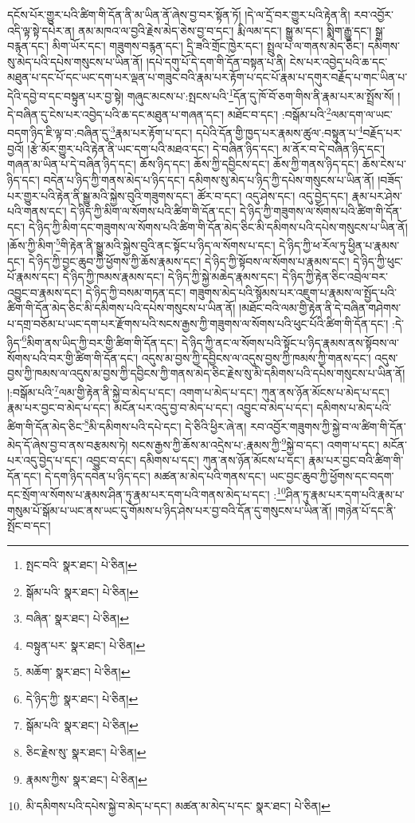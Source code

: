དངོས་པོར་གྱུར་པའི་ཚིག་གི་དོན་ནི་མ་ཡིན་ནོ་ཞེས་བྱ་བར་སྟོན་ཏོ། །དེ་ལ་དྲོ་བར་གྱུར་པའི་རྟེན་ནི། རབ་འབྱོར་འདི་ལྟ་སྟེ་དཔེར་ན། ནམ་མཁའ་ལ་བྱའི་རྗེས་མེད་ཅེས་བྱ་བ་དང་། རྨི་ལམ་དང་། སྒྱུ་མ་དང་། སྨིག་རྒྱུ་དང་། སྒྲ་བརྙན་དང་། མིག་ཡོར་དང་། གཟུགས་བརྙན་དང་། དྲི་ཟའི་གྲོང་ཁྱེར་དང་། སྤྲུལ་པ་ལ་གནས་མེད་ཅིང་། དམིགས་སུ་མེད་པའི་དཔེས་གསུངས་པ་ཡིན་ནོ། །དཔེ་དགུ་པོ་དེ་དག་གི་དོན་བསྟན་པ་ནི། ངེས་པར་འབྱེད་པའི་ཆ་དང་མཐུན་པ་དང་པོ་དང་ཡང་དག་པར་ལྡན་པ་གཟུང་བའི་རྣམ་པར་རྟོག་པ་དང་པོ་རྣམ་པ་དགུར་བརྗོད་པ་གང་ཡིན་པ་དེའི་དབྱེ་བ་དང་བསྟུན་པར་བྱ་སྟེ། གཞུང་མངས་པ་:སྤངས་པའི་\footnote{སྤང་བའི་  སྣར་ཐང་།  པེ་ཅིན། }དོན་དུ་ཁོ་བོ་ཅག་གིས་ནི་རྣམ་པར་མ་སྤྲོས་སོ། །དེ་བཞིན་དུ་ངེས་པར་འབྱེད་པའི་ཆ་དང་མཐུན་པ་གཞན་དང་། མཐོང་བ་དང་། :བསྒོམ་པའི་\footnote{སྒོམ་པའི་  སྣར་ཐང་།  པེ་ཅིན། }ལམ་དག་ལ་ཡང་བདག་ཉིད་ཇི་ལྟ་བ་:བཞིན་དུ་\footnote{བཞིན་  སྣར་ཐང་།  པེ་ཅིན། }རྣམ་པར་རྟོག་པ་དང་། དཔེའི་དོན་གྱི་ཁྱད་པར་རྣམས་ཚུལ་:བསྟུན་པ་\footnote{བསྟུན་པར་  སྣར་ཐང་།  པེ་ཅིན། }བརྗོད་པར་བྱའོ། །རྩེ་མོར་གྱུར་པའི་རྟེན་ནི་ཡང་དག་པའི་མཐའ་དང་། དེ་བཞིན་ཉིད་དང་། མ་ནོར་བ་དེ་བཞིན་ཉིད་དང་། གཞན་མ་ཡིན་པ་དེ་བཞིན་ཉིད་དང་། ཆོས་ཉིད་དང་། ཆོས་ཀྱི་དབྱིངས་དང་། ཆོས་ཀྱི་གནས་ཉིད་དང་། ཆོས་ངེས་པ་ཉིད་དང་། བདེན་པ་ཉིད་ཀྱི་གནས་མེད་པ་ཉིད་དང་། དམིགས་སུ་མེད་པ་ཉིད་ཀྱི་དཔེས་གསུངས་པ་ཡིན་ནོ། །བཟོད་པར་གྱུར་པའི་རྟེན་ནི་སྒྱུ་མའི་སྐྱེས་བུའི་གཟུགས་དང་། ཚོར་བ་དང་། འདུ་ཤེས་དང་། འདུ་བྱེད་དང་། རྣམ་པར་ཤེས་པའི་གནས་དང་། དེ་ཉིད་ཀྱི་མིག་ལ་སོགས་པའི་ཚིག་གི་དོན་དང་། དེ་ཉིད་ཀྱི་གཟུགས་ལ་སོགས་པའི་ཚིག་གི་དོན་དང་། དེ་ཉིད་ཀྱི་མིག་དང་གཟུགས་ལ་སོགས་པའི་ཚིག་གི་དོན་མེད་ཅིང་མི་དམིགས་པའི་དཔེས་གསུངས་པ་ཡིན་ནོ། །ཆོས་ཀྱི་མིག་\footnote{མཆོག་  སྣར་ཐང་།  པེ་ཅིན། }གི་རྟེན་ནི་སྒྱུ་མའི་སྐྱེས་བུའི་ནང་སྟོང་པ་ཉིད་ལ་སོགས་པ་དང་། དེ་ཉིད་ཀྱི་ཕ་རོལ་ཏུ་ཕྱིན་པ་རྣམས་དང་། དེ་ཉིད་ཀྱི་བྱང་ཆུབ་ཀྱི་ཕྱོགས་ཀྱི་ཆོས་རྣམས་དང་། དེ་ཉིད་ཀྱི་སྟོབས་ལ་སོགས་པ་རྣམས་དང་། དེ་ཉིད་ཀྱི་ཕུང་པོ་རྣམས་དང་། དེ་ཉིད་ཀྱི་ཁམས་རྣམས་དང་། དེ་ཉིད་ཀྱི་སྐྱེ་མཆེད་རྣམས་དང་། དེ་ཉིད་ཀྱི་རྟེན་ཅིང་འབྲེལ་བར་འབྱུང་བ་རྣམས་དང་། དེ་ཉིད་ཀྱི་བསམ་གཏན་དང་། གཟུགས་མེད་པའི་སྙོམས་པར་འཇུག་པ་རྣམས་ལ་སྤྱོད་པའི་ཚིག་གི་དོན་མེད་ཅིང་མི་དམིགས་པའི་དཔེས་གསུངས་པ་ཡིན་ནོ། །མཐོང་བའི་ལམ་གྱི་རྟེན་ནི་དེ་བཞིན་གཤེགས་པ་དགྲ་བཅོམ་པ་ཡང་དག་པར་རྫོགས་པའི་སངས་རྒྱས་ཀྱི་གཟུགས་ལ་སོགས་པའི་ཕུང་པོའི་ཚིག་གི་དོན་དང་། :དེ་ཉིད་\footnote{དེ་ཉིད་ཀྱི་  སྣར་ཐང་།  པེ་ཅིན། }མིག་ནས་ཡིད་ཀྱི་བར་གྱི་ཚིག་གི་དོན་དང་། དེ་ཉིད་ཀྱི་ནང་ལ་སོགས་པའི་སྟོང་པ་ཉིད་རྣམས་ནས་སྟོབས་ལ་སོགས་པའི་བར་གྱི་ཚིག་གི་དོན་དང་། འདུས་མ་བྱས་ཀྱི་དབྱིངས་ལ་འདུས་བྱས་ཀྱི་ཁམས་ཀྱི་གནས་དང་། འདུས་བྱས་ཀྱི་ཁམས་ལ་འདུས་མ་བྱས་ཀྱི་དབྱིངས་ཀྱི་གནས་མེད་ཅིང་རྗེས་སུ་མི་དམིགས་པའི་དཔེས་གསུངས་པ་ཡིན་ནོ། །:བསྒོམ་པའི་\footnote{སྒོམ་པའི་  སྣར་ཐང་།  པེ་ཅིན། }ལམ་གྱི་རྟེན་ནི་སྐྱེ་བ་མེད་པ་དང་། འགག་པ་མེད་པ་དང་། ཀུན་ནས་ཉོན་མོངས་པ་མེད་པ་དང་། རྣམ་པར་བྱང་བ་མེད་པ་དང་། མངོན་པར་འདུ་བྱ་བ་མེད་པ་དང་། འབྱུང་བ་མེད་པ་དང་། དམིགས་པ་མེད་པའི་ཚིག་གི་དོན་མེད་ཅིང་\footnote{ཅིང་རྗེས་སུ་  སྣར་ཐང་།  པེ་ཅིན། }མི་དམིགས་པའི་དཔེ་དང་། དེ་ཅིའི་ཕྱིར་ཞེ་ན། རབ་འབྱོར་གཟུགས་ཀྱི་སྐྱེ་བ་ལ་ཚིག་གི་དོན་མེད་དོ་ཞེས་བྱ་བ་ནས་བརྩམས་ཏེ། སངས་རྒྱས་ཀྱི་ཆོས་མ་འདྲེས་པ་:རྣམས་ཀྱི་\footnote{རྣམས་ཀྱིས་  སྣར་ཐང་།  པེ་ཅིན། }སྐྱེ་བ་དང་། འགག་པ་དང་། མངོན་པར་འདུ་བྱེད་པ་དང་། འབྱུང་བ་དང་། དམིགས་པ་དང་། ཀུན་ནས་ཉོན་མོངས་པ་དང་། རྣམ་པར་བྱང་བའི་ཚིག་གི་དོན་དང་། དེ་དག་ཉིད་དབེན་པ་ཉིད་དང་། མཚན་མ་མེད་པའི་གནས་དང་། ཡང་བྱང་ཆུབ་ཀྱི་ཕྱོགས་དང་བདག་དང་སྲོག་ལ་སོགས་པ་རྣམས་ཤིན་ཏུ་རྣམ་པར་དག་པའི་གནས་མེད་པ་དང་། :\footnote{མི་དམིགས་པའི་དཔེས་སྐྱེ་བ་མེད་པ་དང་། མཚན་མ་མེད་པ་དང་  སྣར་ཐང་།  པེ་ཅིན། }ཤིན་ཏུ་རྣམ་པར་དག་པའི་རྣམ་པ་གསུམ་པོ་སྒོམ་པ་ཡང་ནས་ཡང་དུ་གོམས་པ་ཉིད་ཤེས་པར་བྱ་བའི་དོན་དུ་གསུངས་པ་ཡིན་ནོ། །གཉེན་པོ་དང་ནི་སྤོང་བ་དང་། 